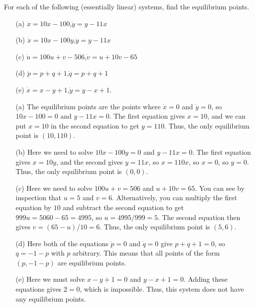 \documentclass[a4paper]{amsart}
\begin{document}
\begin{exercise}\label{ex-affine-equilibria}
 For each of the following (essentially linear) systems, find the
 equilibrium points. 
 \begin{itemize}
  \item[(a)] $\dot{x}=10x-100$,\;$\dot{y}=y-11x$
  \item[(b)] $\dot{x}=10x-100y$,\;$\dot{y}=y-11x$
  \item[(c)] $\dot{u}=100u+v-506$,\;$\dot{v}=u+10v-65$
  \item[(d)] $\dot{p}=p+q+1$,\;$\dot{q}=p+q+1$
  \item[(e)] $\dot{x}=x-y+1$,\;$\dot{y}=y-x+1$.
 \end{itemize}
\end{exercise}
\begin{solution}\leavevmode
 \begin{itemize}
  \item[(a)] The equilibrium points are the points where $\dot{x}=0$
   and $\dot{y}=0$, so $10x-100=0$ and $y-11x=0$.  The first equation
   gives $x=10$, and we can put $x=10$ in the second equation to get
   $y=110$.  Thus, the only equilibrium point is $(10,110)$.
  \item[(b)] Here we need to solve $10x-100y=0$ and $y-11x=0$.  The
   first equation gives $x=10y$, and the second gives $y=11x$, so
   $x=110x$, so $x=0$, so $y=0$.  Thus, the only equilibrium point is
   $(0,0)$.
  \item[(c)] Here we need to solve $100u+v=506$ and $u+10v=65$.  You
   can see by inspection that $u=5$ and $v=6$.  Alternatively, you can
   multiply the first equation by $10$ and subtract the second
   equation to get $999u=5060-65=4995$, so $u=4995/999=5$.  The second
   equation then gives $v=(65-u)/10=6$.  Thus, the only equilibrium
   point is $(5,6)$.
  \item[(d)] Here both of the equations $\dot{p}=0$ and $\dot{q}=0$
   give $p+q+1=0$, so $q=-1-p$ with $p$ arbitrary.  This means that
   all points of the form $(p,-1-p)$ are equilibrium points.
  \item[(e)] Here we must solve $x-y+1=0$ and $y-x+1=0$.  Adding these
   equations gives $2=0$, which is impossible.  Thus, this system does
   not have any equilibrium points.
 \end{itemize}
\end{solution}
\end{document}
